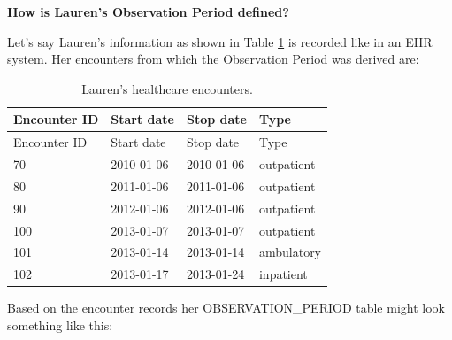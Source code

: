 \documentclass[11pt]{book}
\theoremstyle{definition}
\theoremstyle{definition}
\theoremstyle{definition}
\theoremstyle{remark}
\begin{document}
\textbf{How is Lauren's Observation Period defined?}

Let's say Lauren's information as shown in Table \ref{tab:encounters} is recorded like in an EHR system. Her encounters from which the Observation Period was derived are:

\begin{longtable}[]{@{}llll@{}}
\caption{\label{tab:encounters} Lauren's healthcare encounters.}\tabularnewline
\toprule
Encounter ID & Start date & Stop date & Type\tabularnewline
\midrule
\endfirsthead
\toprule
Encounter ID & Start date & Stop date & Type\tabularnewline
\midrule
\endhead
70 & 2010-01-06 & 2010-01-06 & outpatient\tabularnewline
80 & 2011-01-06 & 2011-01-06 & outpatient\tabularnewline
90 & 2012-01-06 & 2012-01-06 & outpatient\tabularnewline
100 & 2013-01-07 & 2013-01-07 & outpatient\tabularnewline
101 & 2013-01-14 & 2013-01-14 & ambulatory\tabularnewline
102 & 2013-01-17 & 2013-01-24 & inpatient\tabularnewline
\bottomrule
\end{longtable}

Based on the encounter records her OBSERVATION\_PERIOD table might look something like this:
\end{document}
